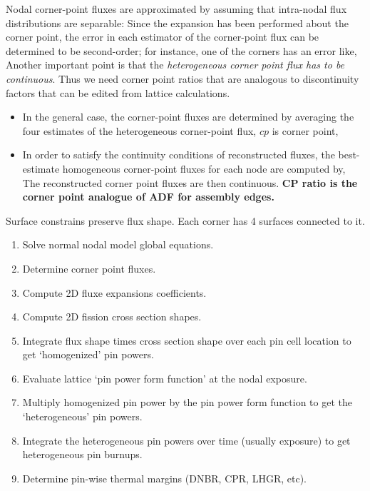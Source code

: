 \documentclass{school-22.211-notes}
\begin{document}
\clearpage
{}
Nodal corner-point fluxes are approximated by assuming that intra-nodal flux distributions are separable: 
Since the expansion has been performed about the corner point, the error in each estimator of the corner-point flux can be determined to be second-order; for instance, one of the corners has an error like, 
Another important point is that the \textit{heterogeneous corner point flux has to be continuous}. Thus we need corner point ratios that are analogous to discontinuity factors that can be edited from lattice calculations. 
\begin{itemize}
\item In the general case, the corner-point fluxes are determined by averaging the four estimates of the heterogeneous corner-point flux, $cp$ is corner point, 

\item In order to satisfy the continuity conditions of reconstructed fluxes, the best-estimate homogeneous corner-point fluxes for each node are computed by, 
  The reconstructed corner point fluxes are then continuous. \textbf{CP ratio is the corner point analogue of ADF for assembly edges.}
\end{itemize}
Surface constrains preserve flux shape. Each corner has 4 surfaces connected to it. 


\clearpage
{}
\begin{enumerate}
\item Solve normal nodal model global equations.
\item Determine corner point fluxes. 
\item Compute 2D fluxe expansions coefficients. 
\item Compute 2D fission cross section shapes.
\item Integrate flux shape times cross section shape over each pin cell location to get `homogenized' pin powers. 
\item Evaluate lattice `pin power form function' at the nodal exposure. 
\item Multiply homogenized pin power by the pin power form function to get the `heterogeneous' pin powers.
\item Integrate the heterogeneous pin powers over time (usually exposure) to get heterogeneous pin burnups. 
\item Determine pin-wise thermal margins (DNBR, CPR, LHGR, etc). 
\end{enumerate}
\end{document}

